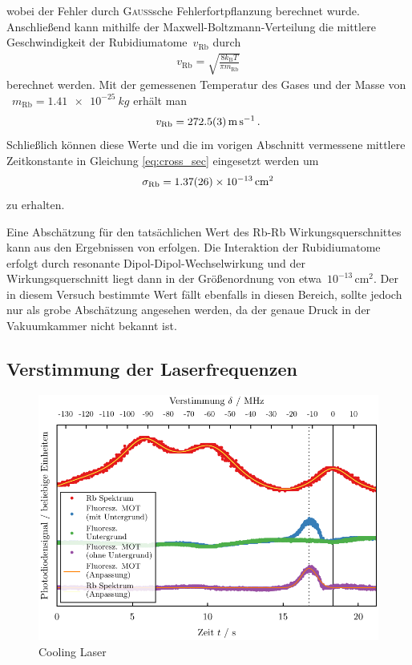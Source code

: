 \documentclass[11pt, a4paper]{article}
\numberwithin{equation}{section}
\begin{document}
wobei der Fehler durch \textsc{Gauß}sche Fehlerfortpflanzung berechnet wurde.
Anschließend kann mithilfe der Maxwell-Boltzmann-Verteilung die mittlere Geschwindigkeit der Rubidiumatome~$v_\mathrm{Rb}$ durch
\begin{align*}
	v_\mathrm{Rb} = \sqrt{\frac{8 k_\mathrm{B} T}{\pi m_\mathrm{Rb}}} 
\end{align*}
berechnet werden.
Mit der gemessenen Temperatur des Gases und der Masse von ~$m_\mathrm{Rb} = \SI{1.41e-25}{kg}$ \cite{handbook_spectroscopic_data} erhält man
\begin{align*}
	v_\mathrm{Rb} = \SI{272.5 +- 0.3}{\meter\per\second} \, \text{.}
\end{align*}
Schließlich können diese Werte und die im vorigen Abschnitt vermessene mittlere Zeitkonstante in Gleichung \eqref{eq:cross_sec} eingesetzt werden um
\begin{align*}
	\sigma_\mathrm{Rb} &= \SI{1.37 +- 0.26e-13}{\centi\meter\squared}\\
\end{align*}
zu erhalten.

Eine Abschätzung für den tatsächlichen Wert des Rb-Rb Wirkungsquerschnittes kann aus den Ergebnissen von \cite{force_in_mot} erfolgen.
Die Interaktion der Rubidiumatome erfolgt durch resonante Dipol-Dipol-Wechselwirkung und der Wirkungsquerschnitt liegt dann in der Größenordnung von etwa~$10^{-13} \, \si{\centi\meter\squared}$.
Der in diesem Versuch bestimmte Wert fällt ebenfalls in diesen Bereich, sollte jedoch nur als grobe Abschätzung angesehen werden, da der genaue Druck in der Vakuumkammer nicht bekannt ist.


\subsection{Verstimmung der Laserfrequenzen}

\begin{figure}
	\centering
	\includegraphics{./figures/detuning_cooling.pdf}
	\caption{Cooling Laser}
\end{figure}
\end{document}
